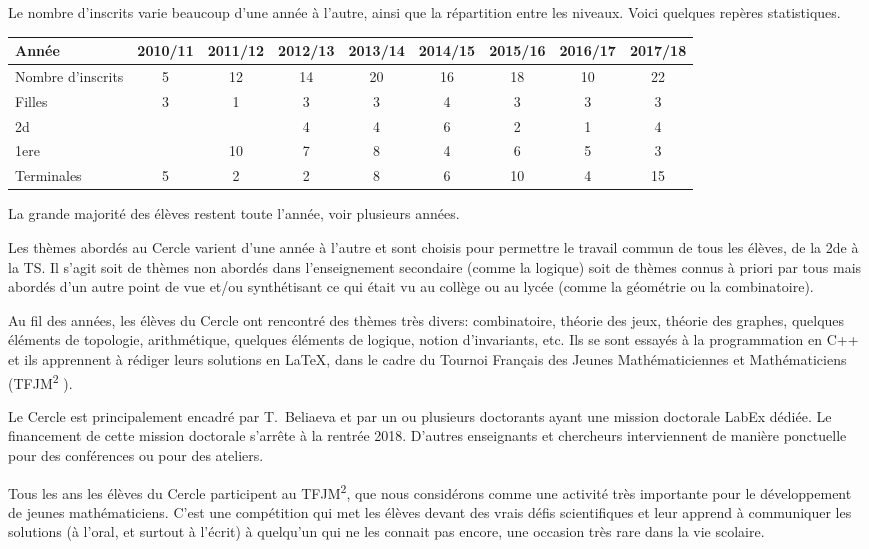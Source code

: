 \documentclass[11pt,notitlepage]{article}
\begin{document}
Le nombre d'inscrits varie beaucoup d'une ann\'ee \`a l'autre, ainsi que la r\'epartition entre les niveaux. Voici quelques rep\`eres statistiques.

\medskip

\begin{tabular}{|l|c|c|c|c|c|c|c|c|}
	\hline
	Ann\'ee & 2010/11&2011/12&2012/13&2013/14&2014/15&2015/16& 2016/17&2017/18\\
	\hline
	Nombre d'inscrits&5 &12 &14 & 20&16 & 18&10 &22 \\
	\hline
	Filles& 3&1 &3 &3&4 &3 & 3&3 \\
	\hline
	2d& & &4 &4 &6 &2 &1 & 4\\
	\hline
	1ere& & 10&7 & 8&4 &6 &5 &3 \\
	\hline
	Terminales&5 &2 &2 &8 &6 &10 &4 &15 \\
	\hline
\end{tabular}

\medskip

La grande majorit\'e des \'el\`eves restent toute l'ann\'ee, voir plusieurs ann\'ees.

 Les th\`emes abord\'es au Cercle varient d'une ann\'ee \`a l'autre et
sont choisis pour permettre
le travail commun de tous les \'el\`eves, de la 2de \`a la TS. Il s'agit soit de th\`emes non abord\'es dans l'enseignement secondaire (comme la logique) soit de th\`emes 
connus \`a priori par tous mais abord\'es d'un autre point de vue et/ou synth\'etisant ce qui \'etait vu au coll\`ege ou au lyc\'ee (comme la g\'eom\'etrie ou la combinatoire).

Au fil des ann\'ees, les \'el\`eves du Cercle ont rencontr\'e  des th\`emes tr\`es divers: combinatoire, th\'eorie des jeux, th\'eorie des graphes, quelques \'el\'ements de topologie, 
arithm\'etique, quelques \'el\'ements de logique, notion d'invariants, etc. Ils se sont essay\'es \`a la programmation en C++ et ils apprennent \`a r\'ediger  leurs solutions en \LaTeX, 
dans le cadre du Tournoi Fran\c cais des Jeunes Math\'ematiciennes et Math\'ematiciens (TFJM\textsuperscript{2} ).

Le Cercle est principalement encadr\'e par T.~Beliaeva et par un ou plusieurs doctorants ayant une mission doctorale LabEx d\'edi\'ee. 
Le financement de cette mission doctorale s'arr\^ete \`a la rentr\'ee 2018. D'autres enseignants et chercheurs interviennent de mani\`ere ponctuelle pour des conf\'erences ou pour des ateliers.

Tous les ans les \'el\`eves du Cercle  participent au TFJM\textsuperscript{2}, que nous consid\'erons comme une activit\'e tr\`es importante pour le d\'eveloppement de jeunes math\'ematiciens. 
C'est une comp\'etition qui met les \'el\`eves devant des vrais d\'efis scientifiques et leur  apprend \`a communiquer les solutions (\`a l'oral, et surtout \`a l'\'ecrit)
 \`a quelqu'un qui ne les connait pas encore, une occasion tr\`es rare dans la vie scolaire.
\end{document}
